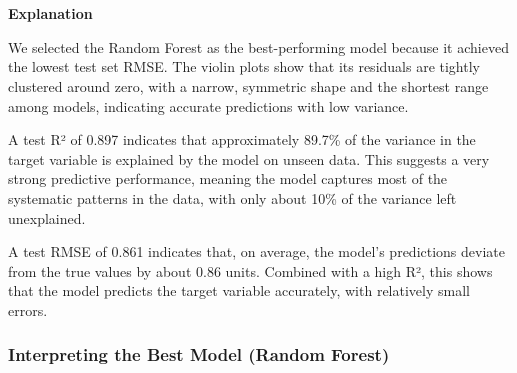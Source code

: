 \documentclass[9pt]{article}
\begin{document}
    
    \begin{center}
    \end{center}
    { \hspace*{\fill} \\}
    
    \begin{center}
    \end{center}
    { \hspace*{\fill} \\}
    
    \textbf{Explanation}

We selected the Random Forest as the best-performing model because it
achieved the lowest test set RMSE. The violin plots show that its
residuals are tightly clustered around zero, with a narrow, symmetric
shape and the shortest range among models, indicating accurate
predictions with low variance.

A test R² of 0.897 indicates that approximately 89.7\% of the variance
in the target variable is explained by the model on unseen data. This
suggests a very strong predictive performance, meaning the model
captures most of the systematic patterns in the data, with only about
10\% of the variance left unexplained.

A test RMSE of 0.861 indicates that, on average, the model's predictions
deviate from the true values by about 0.86 units. Combined with a high
R², this shows that the model predicts the target variable accurately,
with relatively small errors.

    \hypertarget{interpreting-the-best-model-random-forest}{%
\subsubsection{Interpreting the Best Model (Random
Forest)}\label{interpreting-the-best-model-random-forest}}
\end{document}
